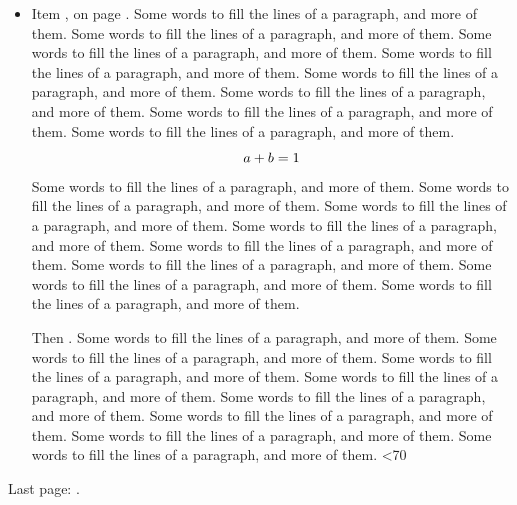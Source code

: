 \documentclass{article}
\def\t{Some words to fill the lines of a paragraph, and more of them. }
\def\tt{\t\t\t\t\t\t\t\t}
\begin{document}
\begin{itemize}
\loop \advance{}
\item Item \the\n, on page \thepage. \tt
\[ a + b = \thepage \]
\tt\par\vskip 3pt \noindent Then \thepage. \tt
\ifnum\n<70 \repeat
\end{itemize}
Last page: \thepage.
\end{document}
